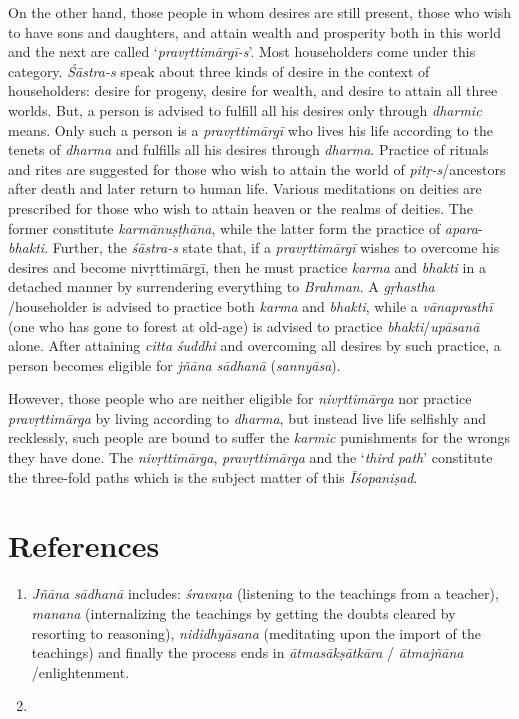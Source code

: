 On the other hand, those people in whom desires are still present, those who wish to have sons and daughters, and attain wealth and prosperity both in this world and the next are called `\emph{pravṛttimārgī-s}'. Most householders come under this category. \emph{Śāstra-s} speak about three kinds of desire in the context of householders: desire for progeny, desire for wealth, and desire to attain all three worlds. But, a person is advised to fulfill all his desires only through \emph{dharmic} means. Only such a person is a \emph{pravṛttimārgī} who lives his life according to the tenets of \emph{dharma} and fulfills all his desires through \emph{dharma}. Practice of rituals and rites are suggested for those who wish to attain the world of \emph{pitṛ-s}/ancestors after death and later return to human life. Various meditations on deities are prescribed for those who wish to attain heaven or the realms of deities. The former constitute \emph{karmānuṣṭhāna}, while the latter form the practice of \emph{apara}-\emph{bhakti}. Further, the \emph{śāstra-s} state that, if a \emph{pravṛttimārgī} wishes to overcome his desires and become nivṛttimārgī, then he must practice \emph{karma} and \emph{bhakti} in a detached manner by surrendering everything to \emph{Brahman}. A \emph{gṛhastha} /householder is advised to practice both \emph{karma} and \emph{bhakti}, while a \emph{vānaprasthī} (one who has gone to forest at old-age) is advised to practice \emph{bhakti}/\emph{upāsanā} alone. After attaining \emph{citta} \emph{śuddhi} and overcoming all desires by such practice, a person becomes eligible for \emph{jñāna} \emph{sādhanā} (\emph{sannyāsa}).

However, those people who are neither eligible for \emph{nivṛttimārga} nor practice \emph{pravṛttimārga} by living according to \emph{dharma}, but instead live life selfishly and recklessly, such people are bound to suffer the \emph{karmic} punishments for the wrongs they have done. The \emph{nivṛttimārga}, \emph{pravṛttimārga} and the `\emph{third} \emph{path}' constitute the three-fold paths which is the subject matter of this \emph{Īśopaniṣad}.

\section*{References}

\begin{enumerate}
\itemsep=0pt
\item
  \emph{Jñāna} \emph{sādhanā} includes: \emph{śravaṇa} (listening to the teachings from a teacher), \emph{manana} (internalizing the teachings by getting the doubts cleared by resorting to reasoning), \emph{nididhyāsana} (meditating upon the import of the teachings) and finally the process ends in \emph{ātmasākṣātkāra} / \emph{ātmajñāna} /enlightenment.
\item
\end{enumerate}
